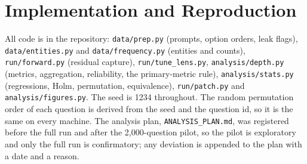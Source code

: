 \section{Implementation and Reproduction}
\label{app:impl}

All code is in the repository: \texttt{data/prep.py} (prompts, option orders, leak flags), \texttt{data/entities.py} and \texttt{data/frequency.py} (entities and counts), \texttt{run/forward.py} (residual capture), \texttt{run/tune\_lens.py}, \texttt{analysis/depth.py} (metrics, aggregation, reliability, the primary-metric rule), \texttt{analysis/stats.py} (regressions, Holm, permutation, equivalence), \texttt{run/patch.py} and \texttt{analysis/figures.py}.
The seed is 1234 throughout.
The random permutation order of each question is derived from the seed and the question id, so it is the same on every machine.
The analysis plan, \texttt{ANALYSIS\_PLAN.md}, was registered before the full run and after the 2{,}000-question pilot, so the pilot is exploratory and only the full run is confirmatory; any deviation is appended to the plan with a date and a reason.
